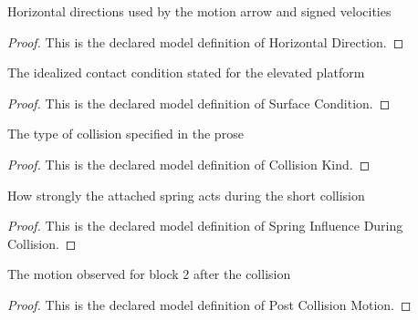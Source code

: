 \begin{definition}
  \label{def:physics:phyx-mini-0255:phyxminiproblems-problemphyxmini0255-horizontaldirection}
  Horizontal directions used by the motion arrow and signed velocities
\end{definition}
\begin{proof}
  This is the declared model definition of Horizontal Direction.
\end{proof}
\begin{definition}
  \label{def:physics:phyx-mini-0255:phyxminiproblems-problemphyxmini0255-surfacecondition}
  The idealized contact condition stated for the elevated platform
\end{definition}
\begin{proof}
  This is the declared model definition of Surface Condition.
\end{proof}
\begin{definition}
  \label{def:physics:phyx-mini-0255:phyxminiproblems-problemphyxmini0255-collisionkind}
  The type of collision specified in the prose
\end{definition}
\begin{proof}
  This is the declared model definition of Collision Kind.
\end{proof}
\begin{definition}
  \label{def:physics:phyx-mini-0255:phyxminiproblems-problemphyxmini0255-springinfluenceduringcollision}
  How strongly the attached spring acts during the short collision
\end{definition}
\begin{proof}
  This is the declared model definition of Spring Influence During Collision.
\end{proof}
\begin{definition}
  \label{def:physics:phyx-mini-0255:phyxminiproblems-problemphyxmini0255-postcollisionmotion}
  The motion observed for block 2 after the collision
\end{definition}
\begin{proof}
  This is the declared model definition of Post Collision Motion.
\end{proof}
